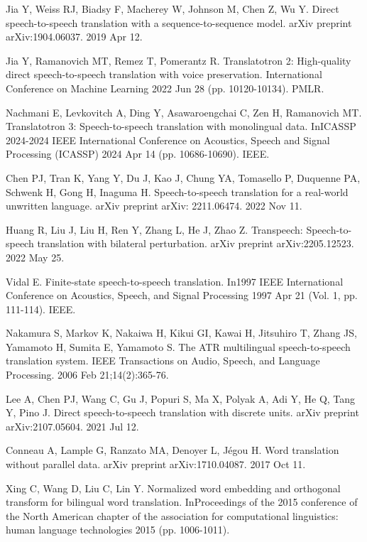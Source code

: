 \documentclass[12pt]{article}
\begin{document}
\begin{thebibliography}{9} %
   
    Jia Y, Weiss RJ, Biadsy F, Macherey W, Johnson M, Chen Z, Wu Y. Direct speech-to-speech translation with a sequence-to-sequence model. arXiv preprint arXiv:1904.06037. 2019 Apr 12.
    
     Jia Y, Ramanovich MT, Remez T, Pomerantz R. Translatotron 2: High-quality direct speech-to-speech translation with voice preservation. International Conference on Machine Learning 2022 Jun 28    (pp. 10120-10134). PMLR.

    Nachmani E, Levkovitch A, Ding Y, Asawaroengchai C, Zen H, Ramanovich MT. Translatotron 3: Speech-to-speech translation with monolingual data. InICASSP 2024-2024 IEEE International Conference on Acoustics, Speech and Signal Processing (ICASSP) 2024 Apr 14 (pp. 10686-10690). IEEE.
 
   
    Chen PJ, Tran K, Yang Y, Du J, Kao J, Chung YA, Tomasello P, Duquenne PA, Schwenk H, Gong H, Inaguma H. Speech-to-speech translation for a real-world unwritten language. arXiv preprint arXiv: 2211.06474. 2022 Nov 11.
  
     
Huang R, Liu J, Liu H, Ren Y, Zhang L, He J, Zhao Z. Transpeech: Speech-to-speech translation with bilateral perturbation. arXiv preprint arXiv:2205.12523. 2022 May 25. 

Vidal E. Finite-state speech-to-speech translation. In1997 IEEE International Conference on Acoustics, Speech, and Signal Processing 1997 Apr 21 (Vol. 1, pp. 111-114). IEEE.

Nakamura S, Markov K, Nakaiwa H, Kikui GI, Kawai H, Jitsuhiro T, Zhang JS, Yamamoto H, Sumita E, Yamamoto S. The ATR multilingual speech-to-speech translation system. IEEE Transactions on Audio, Speech, and Language Processing. 2006 Feb 21;14(2):365-76.


Lee A, Chen PJ, Wang C, Gu J, Popuri S, Ma X, Polyak A, Adi Y, He Q, Tang Y, Pino J. Direct speech-to-speech translation with discrete units. arXiv preprint arXiv:2107.05604. 2021 Jul 12.


Conneau A, Lample G, Ranzato MA, Denoyer L, Jégou H. Word translation without parallel data. arXiv preprint arXiv:1710.04087. 2017 Oct 11.

Xing C, Wang D, Liu C, Lin Y. Normalized word embedding and orthogonal transform for bilingual word translation. InProceedings of the 2015 conference of the North American chapter of the association for computational linguistics: human language technologies 2015 (pp. 1006-1011).


\end{thebibliography}
\end{document}
